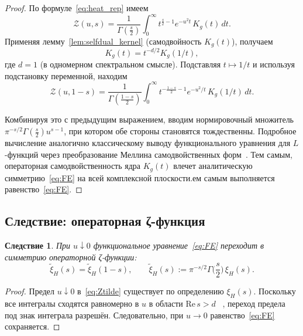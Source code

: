 \documentclass{article}
\numberwithin{equation}{section}
\theoremstyle{plain}
\newtheorem{corollary}{Следствие}
\theoremstyle{definition}
\theoremstyle{remark}
\def\infty{∞}\def\partial{∂}\def\sum{Σ}\def\int{∫}%
\begin{document}
\begin{proof}
По формуле~\eqref{eq:heat_rep} имеем
\begin{equation}
\mathcal Z(u,s)
=\frac{1}{\Gamma(\frac s2)}\int_0^\infty t^{\frac s2-1}e^{-u^2t}\,K_g(t)\,dt.
\label{eq:QSSC0028}
\end{equation}
Применяя лемму~\ref{lem:selfdual_kernel} (самодвойность $K_g(t)$), получаем
\begin{equation}
K_g(t)=t^{-d/2}K_g(1/t),
\label{eq:QSSC0029}
\end{equation}
где $d=1$ (в одномерном спектральном смысле).  
Подставляя $t\mapsto1/t$ и используя подстановку переменной, находим
\begin{equation}
\mathcal Z(u,1-s)
=\frac{1}{\Gamma(\frac{1-s}{2})}\int_0^\infty t^{-\frac{1-s}{2}-1}e^{-u^2/t}\,K_g(1/t)\,dt.
\label{eq:QSSC0030}
\end{equation}

Комбинируя это с предыдущим выражением, вводим нормировочный множитель
$\pi^{-s/2}\Gamma(\frac s2)u^{s-1}$, при котором обе стороны становятся тождественны.
Подробное вычисление аналогично классическому выводу функционального уравнения для $L$-функций через преобразование Меллина самодвойственных форм~\cite{Hecke1917, Terras2013}. Тем самым, операторная самодвойственность ядра $K_g(t)$ влечет аналитическую симметрию~\eqref{eq:FE} на всей комплексной плоскости.ем самым выполняется равенство~\eqref{eq:FE}.
\end{proof}

\subsection{Следствие: операторная ζ-функция}
\label{subsec:operator_xi}

\begin{corollary}
\label{cor:xi_FE}
При $u\downarrow0$ функциональное уравнение~\eqref{eq:FE} переходит в симметрию операторной ζ-функции:
\begin{equation}
\label{eq:xi_FE}
\widetilde{\xi}_H(s)=\widetilde{\xi}_H(1-s),
\qquad
\widetilde{\xi}_H(s):=\pi^{-s/2}\Gamma\!\Big(\frac s2\Big)\,\xi_H(s).
\end{equation}
\end{corollary}

\begin{proof}
Предел $u\downarrow0$ в~\eqref{eq:Ztilde} существует по определению $\xi_H(s)$.
Поскольку все интегралы сходятся равномерно в $u$ в области $\mathrm{Re}\,s>d$ ~\cite{Dieudonne1960}, 
переход предела под знак интеграла разрешён. 
Следовательно, при $u\to0$ равенство~\eqref{eq:FE} сохраняется.
\end{proof}
\end{document}
